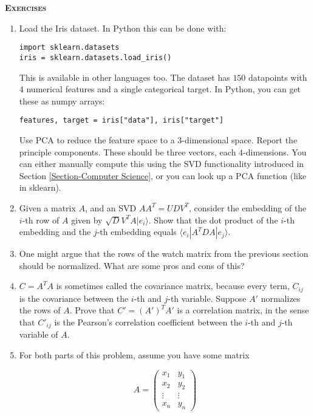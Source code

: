 \documentclass{amsbook}
\begin{document}
{\bfseries\scshape\Large Exercises}

\begin{enumerate}
\item \label{Ex-Iris PCA} Load the Iris dataset.  In Python this can be done with:

\begin{lstlisting}
import sklearn.datasets
iris = sklearn.datasets.load_iris()
\end{lstlisting}

This is available in other languages too.  The dataset has $150$ datapoints with $4$ numerical features and a single categorical target.  In Python, you can get these as numpy arrays:

\begin{lstlisting}
features, target = iris["data"], iris["target"]
\end{lstlisting}

Use PCA to reduce the feature space to a $3$-dimensional space.  Report the principle components.  These should be three vectors, each $4$-dimensions.  You can either manually compute this using the SVD functionality introduced in Section \ref{Section-Computer Science}, or you can look up a PCA function (like in sklearn).
\item Given a matrix $A$, and an SVD $AA^T=UDV^T$, consider the embedding of the $i$-th row of $A$ given by $\sqrt DV^TA|e_i\rangle$.  Show that the dot product of the $i$-th embedding and the $j$-th embedding equals $\langle e_i|A^TDA|e_j\rangle$.
\item One might argue that the rows of the watch matrix from the previous section should be normalized.  What are some pros and cons of this?
\item $C=A^TA$ is sometimes called the covariance matrix, because every term, $C_{ij}$ is the covariance between the $i$-th and $j$-th variable.  Suppose $A'$ normalizes the rows of $A$.  Prove that $C'=(A')^TA'$ is a correlation matrix, in the sense that $C'_{ij}$ is the Pearson's correlation coefficient between the $i$-th and $j$-th variable of $A$.
\item For both parts of this problem, assume you have some matrix

$$
A=\left(\begin{array}{cc} x_1 & y_1 \\ x_2 & y_2 \\ \vdots & \vdots \\ x_n & y_n\end{array}\right)
$$


\end{enumerate}
\end{document}
